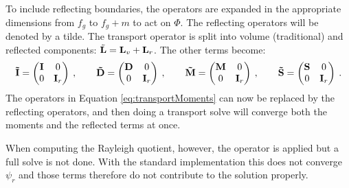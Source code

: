 To include reflecting boundaries, the operators are expanded in the appropriate dimensions from $f_{g}$ to $f_{g} + m$ to act on $\Phi$. The reflecting operators will be denoted by a tilde. The transport operator is split into volume (traditional) and reflected components: $\tilde{\mathbf{L}} = \mathbf{L}_{v} + \mathbf{L}_{r}$. The other terms become:
%
\begin{alignat}{4}
  \mathbf{\tilde{I}} = \begin{pmatrix} \mathbf{I} & 0 \\ 0 & \mathbf{I}_{r} \end{pmatrix} \:, \nonumber
 \qquad
 \mathbf{\tilde{D}} = \begin{pmatrix} \mathbf{D} & 0 \\ 0 & \mathbf{I}_{r} \end{pmatrix} \:, \nonumber
 \qquad
 \mathbf{\tilde{M}} = \begin{pmatrix} \mathbf{M} & 0 \\ 0 & \mathbf{I}_{r} \end{pmatrix} \:, \nonumber
 \qquad
 \mathbf{\tilde{S}} = \begin{pmatrix} \mathbf{S} & 0 \\ 0 & \mathbf{I}_{r} \end{pmatrix} \:. \nonumber
\end{alignat}
%
The operators in Equation \eqref{eq:transportMoments} can now be replaced by the reflecting operators, and then doing a transport solve will converge both the moments and the reflected terms at once. 

When computing the Rayleigh quotient, however, the operator is applied but a full solve is not done. With the standard implementation this does not converge $\psi_{r}$ and those terms therefore do not contribute to the solution properly. 

